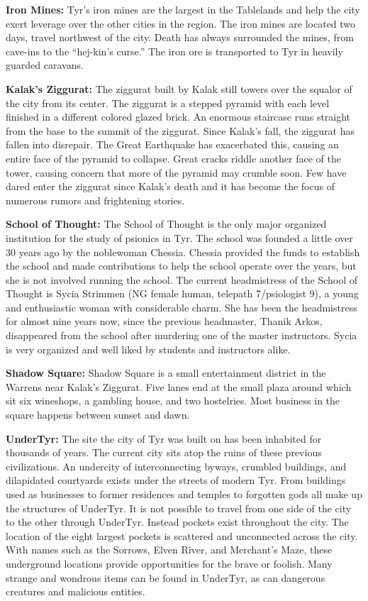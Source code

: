 {	\textbf{Iron Mines:} Tyr's iron mines are the largest in the Tablelands and help the city exert leverage over the other cities in the region. The iron mines are located two days, travel northwest of the city. Death has always surrounded the mines, from cave-ins to the ``hej-kin's curse.'' The iron ore is transported to Tyr in heavily guarded caravans.

	\textbf{Kalak's Ziggurat:} The ziggurat built by Kalak still towers over the squalor of the city from its center. The ziggurat is a stepped pyramid with each level finished in a different colored glazed brick. An enormous staircase runs straight from the base to the summit of the ziggurat. Since Kalak's fall, the ziggurat has fallen into disrepair. The Great Earthquake has exacerbated this, causing an entire face of the pyramid to collapse. Great cracks riddle another face of the tower, causing concern that more of the pyramid may crumble soon. Few have dared enter the ziggurat since Kalak's death and it has become the focus of numerous rumors and frightening stories.

	\textbf{School of Thought:} The School of Thought is the only major organized institution for the study of psionics in Tyr. The school was founded a little over 30 years ago by the noblewoman Chessia. Chessia provided the funds to establish the school and made contributions to help the school operate over the years, but she is not involved running the school. The current headmistress of the School of Thought is Sycia Strimmen (NG female human, telepath 7/psiologist 9), a young and enthusiastic woman with considerable charm. She has been the headmistress for almost nine years now, since the previous headmaster, Thanik Arkos, disappeared from the school after murdering one of the master instructors. Sycia is very organized and well liked by students and instructors alike.

	\textbf{Shadow Square:} Shadow Square is a small entertainment district in the Warrens near Kalak's Ziggurat. Five lanes end at the small plaza around which sit six wineshops, a gambling house, and two hostelries. Most business in the square happens between sunset and dawn.

	\textbf{UnderTyr:} The site the city of Tyr was built on has been inhabited for thousands of years. The current city sits atop the ruins of these previous civilizations. An undercity of interconnecting byways, crumbled buildings, and dilapidated courtyards exists under the streets of modern Tyr. From buildings used as businesses to former residences and temples to forgotten gods all make up the structures of UnderTyr. It is not possible to travel from one side of the city to the other through UnderTyr. Instead pockets exist throughout the city. The location of the eight largest pockets is scattered and unconnected across the city. With names such as the Sorrows, Elven River, and Merchant's Maze, these underground locations provide opportunities for the brave or foolish. Many strange and wondrous items can be found in UnderTyr, as can dangerous creatures and malicious entities.

}
